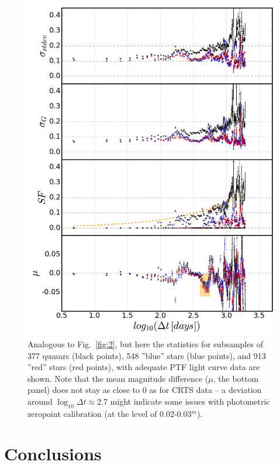 \documentclass[fleqn,usenatbib]{mnras}
\begin{document}
\begin{figure}
\includegraphics[width=1.1\columnwidth, center]{Fig_6_PTF.png}
\caption{Analogous to Fig.~\ref{fig:2}, but here the statistics for subsamples of 377 quasars (black points), 548 ''blue'' stars (blue points), and 913 ''red'' stars (red points), with adequate PTF light curve data are shown. Note that the mean magnitude difference ($\mu$, the bottom panel) does not stay as close to 0 as for CRTS data -- a deviation around $\log_{10} \Delta t \approx 2.7$ might indicate some issues with photometric zeropoint calibration (at the level of 0.02-0.03$^m$).}
\label{fig:2PTF} 
\end{figure}



\section{Conclusions}
\end{document}
